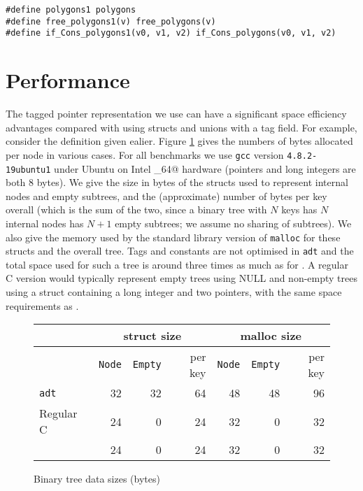 \begin{verbatim}
#define polygons1 polygons
#define free_polygons1(v) free_polygons(v)
#define if_Cons_polygons1(v0, v1, v2) if_Cons_polygons(v0, v1, v2)
\end{verbatim}

\section{Performance}
\label{sec-perf}


The tagged pointer representation we use can have a significant space
efficiency advantages compared with using structs and unions with a tag field.
For example, consider the \verb@tree@ definition given ealier.
Figure \ref{fig:bintreesize} gives the numbers of bytes allocated per node
in various cases.  For all benchmarks we
use \texttt{gcc} version \texttt{4.8.2-19ubuntu1} under Ubuntu on Intel
_64@ hardware (pointers and long integers are both 8 bytes).
We give the size in bytes of the structs
used to represent internal nodes and empty subtrees, and the (approximate)
number of bytes per key overall (which is the sum of the two, since a
binary tree with $N$ keys has $N$ internal nodes has $N+1$ empty subtrees;
we assume
no sharing of subtrees).  We also give the memory used by the standard
library version of \texttt{malloc}
for these structs and the overall tree.  Tags and constants are
not optimised in \texttt{adt} and the total space used for such a tree is
around three times as much as for \adtpp.  A regular C version would
typically represent empty trees using NULL and non-empty trees using a
struct containing a long integer and two pointers, with the same space
requirements as \adtpp.


\begin{figure}[!ht]
\begin{center}
\begin{tabular}{|l|r|r|r|r|r|r|}
\hline
	& \multicolumn{3}{c|}{struct size} &
		\multicolumn{3}{c|}{malloc size} \\
\hline
	& \texttt{Node} & \texttt{Empty} & per key &
		\texttt{Node} & \texttt{Empty} & per key \\
\hline
\texttt{adt}	& 32	& 32	& 64	& 48	& 48	& 96	\\
Regular C	& 24	& 0	& 24	& 32	& 0	& 32	\\
\adtpp  	& 24	& 0	& 24	& 32	& 0	& 32	\\
\hline
\end{tabular}
\caption{Binary tree data sizes (bytes)}
\label{fig:bintreesize}
\end{center}
\end{figure}

